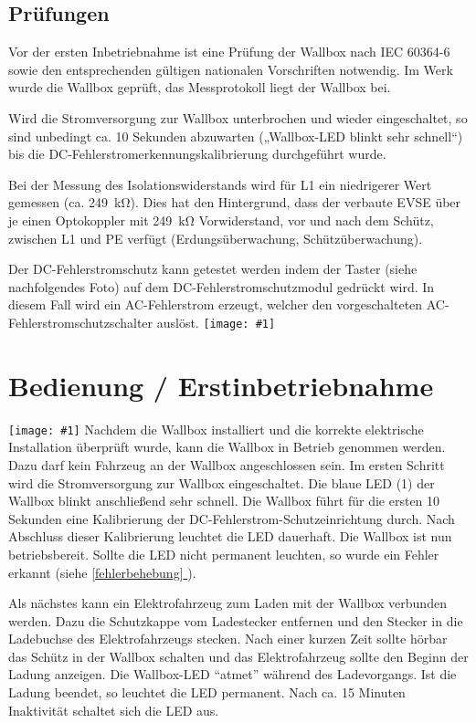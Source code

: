 \documentclass[a4paper,10pt]{article}
\newcommand{\gfx}[1]{\texttt{[image: \#1]}}
\newcommand*{\fullref}[1]{\hyperref[{#1}]{\ref*{#1} \nameref*{#1}}}
\begin{document}
\begin{multicols*}{2}
	\subsection{Prüfungen}
	Vor der ersten Inbetriebnahme ist eine Prüfung der Wallbox nach IEC 60364-6
	sowie den entsprechenden gültigen nationalen Vorschriften notwendig. Im Werk
	wurde die Wallbox geprüft, das Messprotokoll liegt der Wallbox bei.

	Wird die Stromversorgung zur Wallbox unterbrochen und wieder eingeschaltet, so
	sind unbedingt ca. 10 Sekunden abzuwarten („Wallbox-LED blinkt sehr schnell“)
	bis die DC-Fehlerstromerkennungskalibrierung durchgeführt wurde.

	Bei der Messung des Isolationswiderstands wird für L1 ein niedrigerer Wert
	gemessen (ca. \SI{249}{\kilo\ohm}). Dies hat den Hintergrund, dass
	der verbaute EVSE über je einen Optokoppler mit
	\SI{249}{\kilo\ohm} Vorwiderstand, vor und nach dem Schütz, zwischen L1 und
	PE verfügt (Erdungsüberwachung, Schützüberwachung).

	Der DC-Fehlerstromschutz kann getestet werden indem der Taster (siehe
	nachfolgendes Foto) auf dem DC-Fehlerstromschutzmodul gedrückt wird. In diesem
	Fall wird ein AC-Fehlerstrom erzeugt, welcher den vorgeschalteten
	AC-Fehlerstromschutzschalter auslöst. \gfx{./img/resized/warp_hole_button_ready} \newpage
	\section{Bedienung / Erstinbetriebnahme} \gfx{./img/resized/warp_button_key_ready} Nachdem die Wallbox installiert
	und die korrekte elektrische Installation überprüft wurde, kann die Wallbox in
	Betrieb genommen werden. Dazu darf kein Fahrzeug an der Wallbox angeschlossen
	sein. Im ersten Schritt wird die Stromversorgung zur Wallbox eingeschaltet. Die
	blaue LED (1) der Wallbox blinkt anschließend sehr schnell. Die Wallbox führt
	für die ersten 10 Sekunden eine Kalibrierung der
	DC-Fehlerstrom-Schutzeinrichtung durch. Nach Abschluss dieser Kalibrierung
	leuchtet die LED dauerhaft. Die Wallbox ist nun betriebsbereit. Sollte die LED
	nicht permanent leuchten, so wurde ein Fehler erkannt (siehe
	\fullref{fehlerbehebung}).

	Als nächstes kann ein Elektrofahrzeug zum Laden mit der Wallbox verbunden
	werden. Dazu die Schutzkappe vom Ladestecker entfernen und den Stecker in die
	Ladebuchse des Elektrofahrzeugs stecken. Nach einer kurzen Zeit sollte hörbar
	das Schütz in der Wallbox schalten und das Elektrofahrzeug sollte den Beginn
	der Ladung anzeigen. Die Wallbox-LED \enquote{atmet} während des
	Ladevorgangs. Ist die Ladung beendet, so leuchtet die LED permanent. Nach ca.
	15 Minuten Inaktivität schaltet sich die LED aus.


\end{multicols*}
\end{document}

